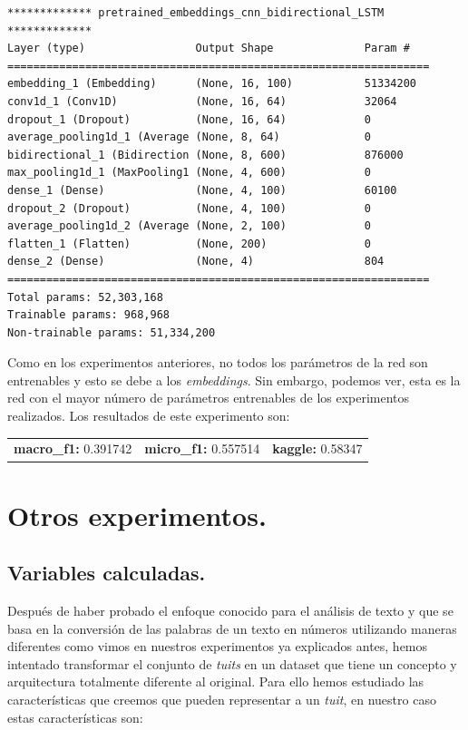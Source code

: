 \documentclass[11pt]{article}
\begin{document}
\begin{verbatim}
************* pretrained_embeddings_cnn_bidirectional_LSTM *************
Layer (type)                 Output Shape              Param #   
=================================================================
embedding_1 (Embedding)      (None, 16, 100)           51334200  
conv1d_1 (Conv1D)            (None, 16, 64)            32064     
dropout_1 (Dropout)          (None, 16, 64)            0         
average_pooling1d_1 (Average (None, 8, 64)             0         
bidirectional_1 (Bidirection (None, 8, 600)            876000    
max_pooling1d_1 (MaxPooling1 (None, 4, 600)            0         
dense_1 (Dense)              (None, 4, 100)            60100     
dropout_2 (Dropout)          (None, 4, 100)            0         
average_pooling1d_2 (Average (None, 2, 100)            0         
flatten_1 (Flatten)          (None, 200)               0         
dense_2 (Dense)              (None, 4)                 804       
=================================================================
Total params: 52,303,168
Trainable params: 968,968
Non-trainable params: 51,334,200
\end{verbatim}

Como en los experimentos anteriores, no todos los parámetros de la red son entrenables y esto se debe a los \textit{embeddings}. Sin embargo, podemos ver, esta es la red con el mayor número de parámetros entrenables de los experimentos realizados. Los resultados de este experimento son: 

\begin{table}[H]
\begin{tabular}{c|c|c}
\textbf{macro\_f1:} 0.391742 & \textbf{micro\_f1:} 0.557514 & \textbf{kaggle:} 0.58347
\end{tabular}
\end{table}

\section{Otros experimentos.}

\subsection{Variables calculadas.}

Después de haber probado el enfoque conocido para el análisis de texto y que se basa en la conversión de las palabras de un texto en números utilizando maneras diferentes como vimos en nuestros experimentos ya explicados antes, hemos intentado transformar el conjunto de \textit{tuits} en un dataset que tiene un concepto y arquitectura totalmente diferente al original. Para ello hemos estudiado las características que creemos que pueden representar a un \textit{tuit}, en nuestro caso estas características son: \\
\end{document}
